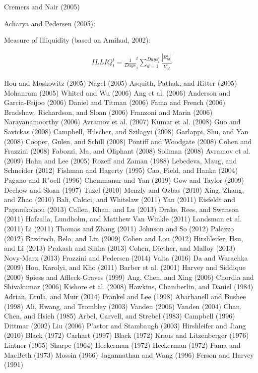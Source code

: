 \documentclass[
  letterpaper,
  DIV=11,
  numbers=noendperiod]{scrreprt}
\begin{document}
Cremers and Nair (2005)

Acharya and Pedersen (2005):

Measure of Illiquidity (based on Amihud, 2002):

\begin{align}
&ILLIQ_t^t=\frac{1}{Days}_i^t \sum_{d=1}^{Days_t^i} \frac{|R_{td}^i|}{V_{td}^i}
\end{align}
\label{Equation:acharya2005assetEquation11}

Hou and Moskowitz (2005) Nagel (2005) Asquith, Pathak, and Ritter (2005)
Mohanram (2005) Whited and Wu (2006) Ang et al. (2006) Anderson and
Garcia-Feijoo (2006) Daniel and Titman (2006) Fama and French (2006)
Bradshaw, Richardson, and Sloan (2006) Franzoni and Marin (2006)
Narayanamoorthy (2006) Avramov et al. (2007) Kumar et al. (2008) Guo and
Savickas (2008) Campbell, Hilscher, and Szilagyi (2008) Garlappi, Shu,
and Yan (2008) Cooper, Gulen, and Schill (2008) Pontiff and Woodgate
(2008) Cohen and Frazzini (2008) Fabozzi, Ma, and Oliphant (2008)
Soliman (2008) Avramov et al. (2009) Hahn and Lee (2005) Rozeff and
Zaman (1988) Lebedeva, Maug, and Schneider (2012) Fishman and Hagerty
(1995) Cao, Field, and Hanka (2004) Pagano and R"oell (1996) Chemmanur
and Yan (2019) Gow and Taylor (2009) Dechow and Sloan (1997) Tuzel
(2010) Menzly and Ozbas (2010) Xing, Zhang, and Zhao (2010) Bali,
Cakici, and Whitelaw (2011) Yan (2011) Eisfeldt and Papanikolaou (2013)
Callen, Khan, and Lu (2013) Drake, Rees, and Swanson (2011) Hafzalla,
Lundholm, and Matthew Van Winkle (2011) Landsman et al. (2011) Li (2011)
Thomas and Zhang (2011) Johnson and So (2012) Palazzo (2012) Bazdrech,
Belo, and Lin (2009) Cohen and Lou (2012) Hirshleifer, Hsu, and Li
(2013) Prakash and Sinha (2013) Cohen, Diether, and Malloy (2013)
Novy-Marx (2013) Frazzini and Pedersen (2014) Valta (2016) Da and
Warachka (2009) Hou, Karolyi, and Kho (2011) Barber et al. (2001) Harvey
and Siddique (2000) Spiess and Affleck-Graves (1999) Ang, Chen, and Xing
(2006) Chordia and Shivakumar (2006) Kishore et al. (2008) Hawkins,
Chamberlin, and Daniel (1984) Adrian, Etula, and Muir (2014) Frankel and
Lee (1998) Abarbanell and Bushee (1998) Ali, Hwang, and Trombley (2003)
Vanden (2006) Vanden (2004) Chan, Chen, and Hsieh (1985) Arbel, Carvell,
and Strebel (1983) Campbell (1996) Dittmar (2002) Liu (2006) P'astor and
Stambaugh (2003) Hirshleifer and Jiang (2010) Black (1972) Carhart
(1997) Black (1972) Kraus and Litzenberger (1976) Lintner (1965) Sharpe
(1964) Heckerman (1972) Heckerman (1972) Fama and MacBeth (1973) Mossin
(1966) Jagannathan and Wang (1996) Ferson and Harvey (1991)
\end{document}
